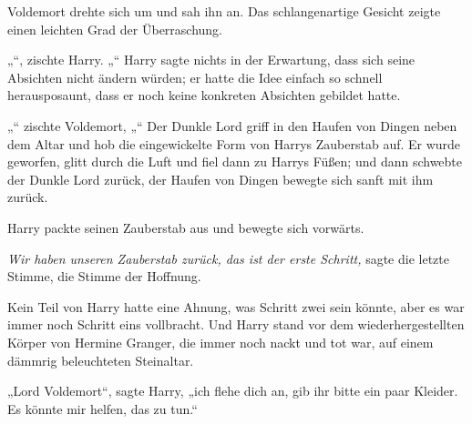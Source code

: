 Voldemort drehte sich um und sah ihn an. Das schlangenartige Gesicht zeigte einen leichten Grad der Überraschung.

„“, zischte Harry. „“
Harry sagte nichts in der Erwartung, dass sich seine Absichten nicht ändern würden; er hatte die Idee einfach so schnell herausposaunt, dass er noch keine konkreten Absichten gebildet hatte.

„“ zischte Voldemort, „“
Der Dunkle Lord griff in den Haufen von Dingen neben dem Altar und hob die eingewickelte Form von Harrys Zauberstab auf. Er wurde geworfen, glitt durch die Luft und fiel dann zu Harrys Füßen; und dann schwebte der Dunkle Lord zurück, der Haufen von Dingen bewegte sich sanft mit ihm zurück.

Harry packte seinen Zauberstab aus und bewegte sich vorwärts.

\emph{Wir haben unseren Zauberstab zurück, das ist der erste Schritt,} sagte die letzte Stimme, die Stimme der Hoffnung.

Kein Teil von Harry hatte eine Ahnung, was Schritt zwei sein könnte, aber es war immer noch Schritt eins vollbracht.
Und Harry stand vor dem wiederhergestellten Körper von Hermine Granger, die immer noch nackt und tot war, auf einem dämmrig beleuchteten Steinaltar.

„Lord Voldemort“, sagte Harry, „ich flehe dich an, gib ihr bitte ein paar Kleider. Es könnte mir helfen, das zu tun.“

